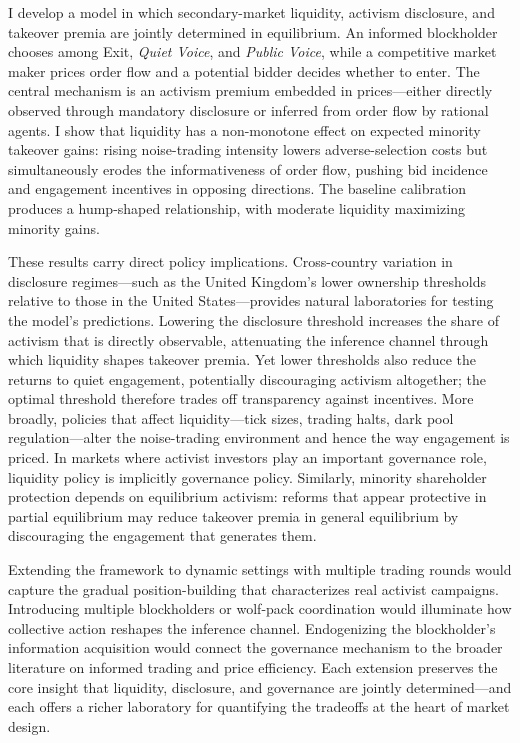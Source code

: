 I develop a model in which secondary-market liquidity, activism disclosure, and
takeover premia are jointly determined in equilibrium. An informed blockholder
chooses among Exit, \emph{Quiet Voice}, and \emph{Public Voice}, while a
competitive market maker prices order flow and a potential bidder decides
whether to enter. The central mechanism is an activism premium embedded in
prices---either directly observed through mandatory disclosure or inferred from
order flow by rational agents. I show that liquidity has a non-monotone effect
on expected minority takeover gains: rising noise-trading intensity lowers
adverse-selection costs but simultaneously erodes the informativeness of order
flow, pushing bid incidence and engagement incentives in opposing directions.
The baseline calibration produces a hump-shaped relationship, with moderate
liquidity maximizing minority gains.

These results carry direct policy implications. Cross-country variation in
disclosure regimes---such as the United Kingdom's lower ownership thresholds
relative to those in the United States---provides natural laboratories for
testing the model's predictions. Lowering the disclosure threshold increases
the share of activism that is directly observable, attenuating the inference
channel through which liquidity shapes takeover premia. Yet lower thresholds
also reduce the returns to quiet engagement, potentially discouraging activism
altogether; the optimal threshold therefore trades off transparency against
incentives. More broadly, policies that affect liquidity---tick sizes, trading
halts, dark pool regulation---alter the noise-trading environment and hence the
way engagement is priced. In markets where activist investors play an important
governance role, liquidity policy is implicitly governance policy. Similarly,
minority shareholder protection depends on equilibrium activism: reforms that
appear protective in partial equilibrium may reduce takeover premia in general
equilibrium by discouraging the engagement that generates them.

Extending the framework to dynamic settings with multiple trading rounds would
capture the gradual position-building that characterizes real activist
campaigns. Introducing multiple blockholders or wolf-pack coordination would
illuminate how collective action reshapes the inference channel. Endogenizing
the blockholder's information acquisition would connect the governance
mechanism to the broader literature on informed trading and price efficiency.
Each extension preserves the core insight that liquidity, disclosure, and
governance are jointly determined---and each offers a richer laboratory for
quantifying the tradeoffs at the heart of market design.
